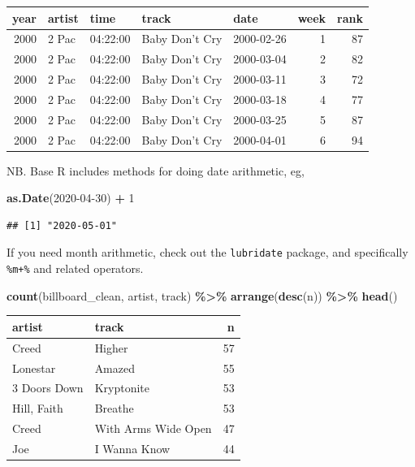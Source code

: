 \documentclass[
]{article}
\newenvironment{Shaded}{\begin{snugshade}}{\end{snugshade}}
\newcommand{\DecValTok}[1]{\textcolor[rgb]{0.00,0.00,0.81}{#1}}
\newcommand{\KeywordTok}[1]{\textcolor[rgb]{0.13,0.29,0.53}{\textbf{#1}}}
\newcommand{\NormalTok}[1]{#1}
\newcommand{\OperatorTok}[1]{\textcolor[rgb]{0.81,0.36,0.00}{\textbf{#1}}}
\newcommand{\StringTok}[1]{\textcolor[rgb]{0.31,0.60,0.02}{#1}}
\begin{document}
\begin{tabular}{r|l|l|l|l|r|r}
\hline
year & artist & time & track & date & week & rank\\
\hline
2000 & 2 Pac & 04:22:00 & Baby Don't Cry & 2000-02-26 & 1 & 87\\
\hline
2000 & 2 Pac & 04:22:00 & Baby Don't Cry & 2000-03-04 & 2 & 82\\
\hline
2000 & 2 Pac & 04:22:00 & Baby Don't Cry & 2000-03-11 & 3 & 72\\
\hline
2000 & 2 Pac & 04:22:00 & Baby Don't Cry & 2000-03-18 & 4 & 77\\
\hline
2000 & 2 Pac & 04:22:00 & Baby Don't Cry & 2000-03-25 & 5 & 87\\
\hline
2000 & 2 Pac & 04:22:00 & Baby Don't Cry & 2000-04-01 & 6 & 94\\
\hline
\end{tabular}

NB. Base R includes methods for doing date arithmetic, eg,

\begin{Shaded}
\begin{Highlighting}[]
\KeywordTok{as.Date}\NormalTok{(}\StringTok{\textquotesingle{}2020{-}04{-}30\textquotesingle{}}\NormalTok{) }\OperatorTok{+}\StringTok{ }\DecValTok{1}
\end{Highlighting}
\end{Shaded}

\begin{verbatim}
## [1] "2020-05-01"
\end{verbatim}

If you need month arithmetic, check out the \texttt{lubridate} package, and specifically \texttt{\%m+\%} and related operators.

\begin{Shaded}
\begin{Highlighting}[]
\KeywordTok{count}\NormalTok{(billboard\_clean, artist, track) }\OperatorTok{\%\textgreater{}\%}\StringTok{ }
\StringTok{    }\KeywordTok{arrange}\NormalTok{(}\KeywordTok{desc}\NormalTok{(n)) }\OperatorTok{\%\textgreater{}\%}\StringTok{ }
\StringTok{    }\KeywordTok{head}\NormalTok{()}
\end{Highlighting}
\end{Shaded}

\begin{tabular}{l|l|r}
\hline
artist & track & n\\
\hline
Creed & Higher & 57\\
\hline
Lonestar & Amazed & 55\\
\hline
3 Doors Down & Kryptonite & 53\\
\hline
Hill, Faith & Breathe & 53\\
\hline
Creed & With Arms Wide Open & 47\\
\hline
Joe & I Wanna Know & 44\\
\hline
\end{tabular}
\end{document}
